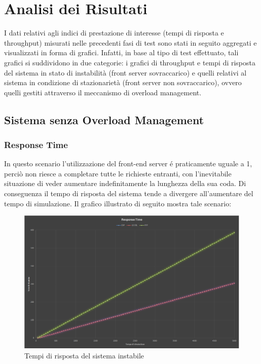 \chapter{Analisi dei Risultati} 

I dati relativi agli indici di prestazione di interesse (tempi di risposta e 
throughput) misurati 
nelle precedenti fasi di test sono stati in seguito aggregati e visualizzati in 
forma di grafici. 
Infatti, in base al tipo di test effettuato, tali grafici si suddividono in due 
categorie: i grafici di 
throughput e tempi di risposta del sistema in stato di instabilit\`a (front 
server sovraccarico) e 
quelli relativi al sistema in condizione di stazionariet\`a (front server non 
sovraccarico), ovvero quelli gestiti
attraverso il meccanismo di overload management.

\section{Sistema senza Overload Management}

\subsection{Response Time}

In questo scenario l'utilizzazione del front-end server \'e praticamente uguale 
a 1, perci\`o 
non riesce a completare tutte le richieste entranti, con l'inevitabile 
situazione di veder aumentare indefinitamente la lunghezza della sua coda. Di 
conseguenza il tempo di risposta del sistema tende a divergere all'aumentare del 
tempo di 
simulazione. Il grafico illustrato di seguito mostra tale scenario:

\begin{figure}[H]
 \centering
 \includegraphics[scale=0.45]{img/responseTime.png}
 \caption[Tempi di risposta del sistema instabile]{Tempi di risposta del sistema 
instabile}
 \label{fig:Tempi di risposta del sistema instabile}
\end{figure}

